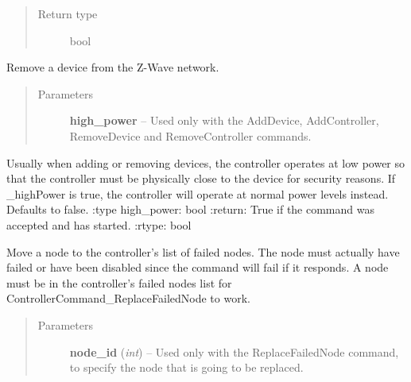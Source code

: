 \documentclass[letterpaper,10pt,english]{sphinxmanual}
\begin{document}
\begin{fulllineitems}
\begin{fulllineitems}
\begin{quote}
\begin{description}
\item[{Return type}] \leavevmode
bool

\end{description}\end{quote}

\end{fulllineitems}


\begin{fulllineitems}
\label{controller:openzwave.controller.ZWaveController.begin_command_remove_device}
Remove a device from the Z-Wave network.
\begin{quote}\begin{description}
\item[{Parameters}] \leavevmode
\textbf{high\_power} -- Used only with the AddDevice, AddController, RemoveDevice and RemoveController commands.

\end{description}\end{quote}

Usually when adding or removing devices, the controller operates at low power so that the controller must
be physically close to the device for security reasons.  If \_highPower is true, the controller will
operate at normal power levels instead.  Defaults to false.
:type high\_power: bool
:return: True if the command was accepted and has started.
:rtype: bool

\end{fulllineitems}


\begin{fulllineitems}
\label{controller:openzwave.controller.ZWaveController.begin_command_remove_failed_node}
Move a node to the controller's list of failed nodes.  The node must
actually have failed or have been disabled since the command
will fail if it responds.  A node must be in the controller's
failed nodes list for ControllerCommand\_ReplaceFailedNode to work.
\begin{quote}\begin{description}
\item[{Parameters}] \leavevmode
\textbf{node\_id} (\emph{int}) -- Used only with the ReplaceFailedNode command, to specify the node that is going to be replaced.


\end{description}
\end{quote}
\end{fulllineitems}
\end{fulllineitems}
\end{document}
